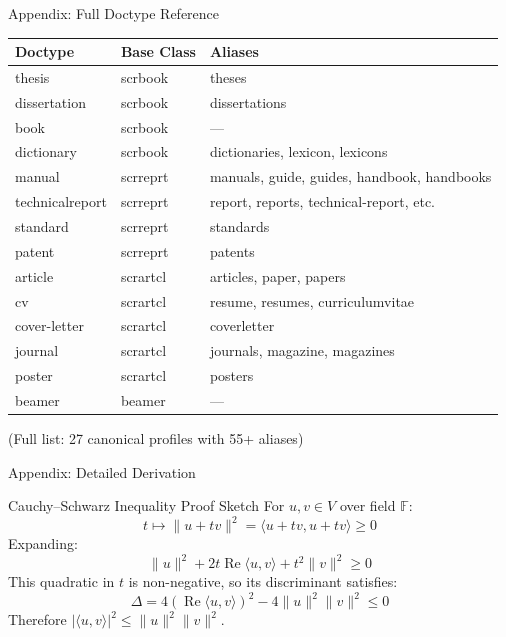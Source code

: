 \documentclass[
  doctype=beamer,
  beameraspectratio=169,
  beamertheme=Madrid,
  institution=generic,
]{omnilatex}
\begin{document}
\begin{frame}[allowframebreaks]{Appendix: Full Doctype Reference}
  \begin{table}
    \centering
    \begin{tabular}{l l l}
      \hline
      Doctype         & Base Class & Aliases \\
      \hline
      thesis          & scrbook    & theses \\
      dissertation    & scrbook    & dissertations \\
      book            & scrbook    & --- \\
      dictionary      & scrbook    & dictionaries, lexicon, lexicons \\
      manual          & scrreprt   & manuals, guide, guides, handbook, handbooks \\
      technicalreport & scrreprt   & report, reports, technical-report, etc. \\
      standard        & scrreprt   & standards \\
      patent          & scrreprt   & patents \\
      article         & scrartcl   & articles, paper, papers \\
      cv              & scrartcl   & resume, resumes, curriculumvitae \\
      cover-letter    & scrartcl   & coverletter \\
      journal         & scrartcl   & journals, magazine, magazines \\
      poster          & scrartcl   & posters \\
      beamer          & beamer     & --- \\
      \hline
    \end{tabular}
  \end{table}
  (Full list: 27 canonical profiles with 55+ aliases)
\end{frame}

\begin{frame}{Appendix: Detailed Derivation}
  \begin{block}{Cauchy--Schwarz Inequality Proof Sketch}
    For $u, v \in V$ over field $\mathbb{F}$:
    \[
      t \mapsto \|u + tv\|^2 = \langle u + tv, u + tv \rangle \geq 0
    \]
    Expanding:
    \[
      \|u\|^2 + 2t \operatorname{Re}\langle u, v \rangle + t^2 \|v\|^2 \geq 0
    \]
    This quadratic in $t$ is non-negative, so its discriminant satisfies:
    \[
      \Delta = 4(\operatorname{Re}\langle u, v \rangle)^2 - 4\|u\|^2\|v\|^2 \leq 0
    \]
    Therefore $|\langle u, v \rangle|^2 \leq \|u\|^2 \|v\|^2$.
  \end{block}
\end{frame}
\end{document}
